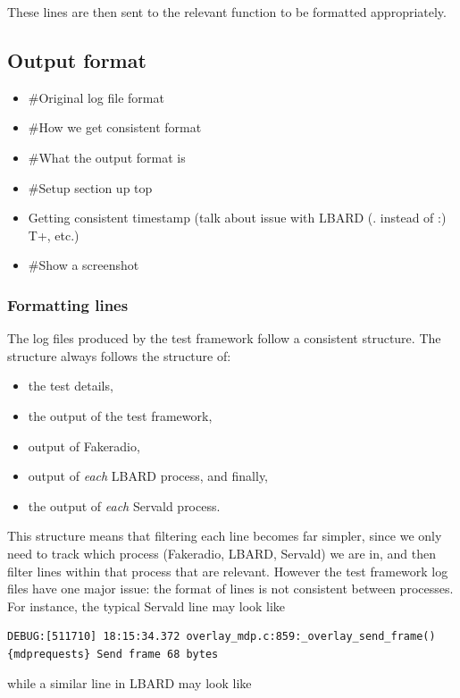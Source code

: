 These lines are then sent to the relevant function to be formatted appropriately.

\subsection{Output format}
\begin{itemize}
    \item \#Original log file format
    \item \#How we get consistent format
    \item \#What the output format is
    \item \#Setup section up top
    \item Getting consistent timestamp (talk about issue with LBARD (. instead of :) T+, etc.)
    \item \#Show a screenshot
\end{itemize}

\subsubsection{Formatting lines}
The log files produced by the test framework follow a consistent structure.
The structure always follows the structure of:
\begin{itemize}
    \item the test details, 
    \item the output of the test framework, 
    \item output of Fakeradio, 
    \item output of \emph{each} LBARD process, and finally,
    \item the output of \emph{each} Servald process.
\end{itemize} 

This structure means that filtering each line becomes far simpler, since we only need to track which process (Fakeradio, LBARD, Servald) we are in, and then filter lines within that process that are relevant.
However the test framework log files have one major issue: the format of lines is not consistent between processes.
For instance, the typical Servald line may look like
\begin{center}
    \begin{lstlisting}[breaklines]
DEBUG:[511710] 18:15:34.372 overlay_mdp.c:859:_overlay_send_frame()  {mdprequests} Send frame 68 bytes    
    \end{lstlisting}
\end{center}
while a similar line in LBARD may look like 

